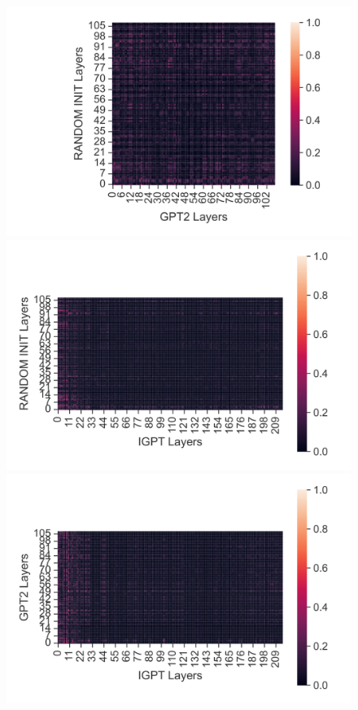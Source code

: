 \documentclass{article}
\begin{document}
\begin{figure}[H]
    \centering
    \begin{minipage}[b]{0.32\linewidth}
        \includegraphics[width=\linewidth]{figs/cka_40_40_dtgpt2_hopper_medium_666_action.png}
    \end{minipage}
    \begin{minipage}[b]{0.32\linewidth}
        \includegraphics[width=\linewidth]{figs/cka_40_40_dtigpt_hopper_medium_666_action.png}
    \end{minipage}
    \begin{minipage}[b]{0.32\linewidth}
        \includegraphics[width=\linewidth]{figs/cka_40_40_gpt2igpt_hopper_medium_666_action.png}

\end{minipage}
\end{figure}
\end{document}
